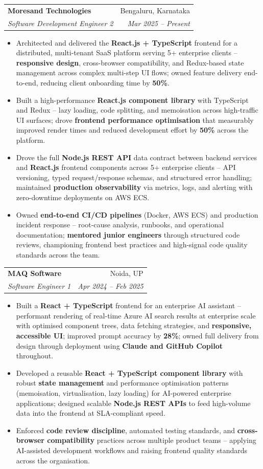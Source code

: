 \documentclass[a4paper,20pt]{article}
\makeatletter
\newcommand{\resumeSubheading}[4]{\vspace{-1pt}\item\begin{tabular*}{0.97\textwidth}{l@{\extracolsep{\fill}}r}\textbf{#1} & #2 \\\textit{#3} & \textit{#4} \\\end{tabular*}\vspace{-5pt}}
\newcommand{\resumeItemListStart}{\begin{itemize}}
\newcommand{\resumeItemListEnd}{\end{itemize}\vspace{-5pt}}
\makeatother
\begin{document}
    \resumeSubheading
      {Moresand Technologies}{Bengaluru, Karnataka}
      {Software Development Engineer 2}{Mar 2025 -- Present}
      \resumeItemListStart
        \item\small{Architected and delivered the \textbf{React.js + TypeScript} frontend for a distributed, multi-tenant SaaS platform serving 5+ enterprise clients -- \textbf{responsive design}, cross-browser compatibility, and Redux-based state management across complex multi-step UI flows; owned feature delivery end-to-end, reducing client onboarding time by \textbf{50\%}.}
        \item\small{Built a high-performance \textbf{React.js component library} with TypeScript and Redux -- lazy loading, code splitting, and memoisation across high-traffic UI surfaces; drove \textbf{frontend performance optimisation} that measurably improved render times and reduced development effort by \textbf{50\%} across the platform.}
        \item\small{Drove the full \textbf{Node.js REST API} data contract between backend services and \textbf{React.js} frontend components across 5+ enterprise clients -- API versioning, typed request/response schemas, and structured error handling; maintained \textbf{production observability} via metrics, logs, and alerting with zero-downtime deployments on AWS ECS.}
        \item\small{Owned \textbf{end-to-end CI/CD pipelines} (Docker, AWS ECS) and production incident response -- root-cause analysis, runbooks, and operational documentation; \textbf{mentored junior engineers} through structured code reviews, championing frontend best practices and high-signal code quality standards across the team.}
      \resumeItemListEnd

    \resumeSubheading
      {MAQ Software}{Noida, UP}
      {Software Engineer 1}{Apr 2024 -- Feb 2025}
      \resumeItemListStart
        \item\small{Built a \textbf{React + TypeScript} frontend for an enterprise AI assistant -- performant rendering of real-time Azure AI search results at enterprise scale with optimised component trees, data fetching strategies, and \textbf{responsive, accessible UI}; improved prompt accuracy by \textbf{28\%}; owned full delivery from design through deployment using \textbf{Claude and GitHub Copilot} throughout.}
        \item\small{Developed a reusable \textbf{React + TypeScript component library} with robust \textbf{state management} and performance optimisation patterns (memoisation, virtualisation, lazy loading) for AI-powered enterprise applications; designed scalable \textbf{Node.js REST APIs} to feed high-volume data into the frontend at SLA-compliant speed.}
        \item\small{Enforced \textbf{code review discipline}, automated testing standards, and \textbf{cross-browser compatibility} practices across multiple product teams -- applying AI-assisted development workflows and raising frontend quality standards across the organisation.}
      \resumeItemListEnd
\end{document}

